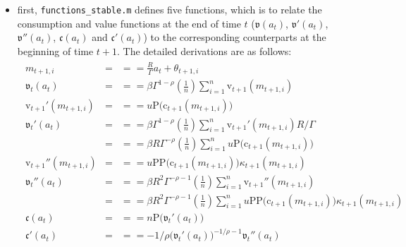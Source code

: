 \documentclass[titlepage,abstract]{\econtex}
\begin{document}
\begin{itemize}
     \item first, \texttt{functions\_stable.m} defines five functions, which is to relate the consumption and value functions at the end of time $t$ ($\ensuremath{\mathfrak{v}}(a_{t})$, $\ensuremath{\mathfrak{v}}'(a_{t})$,
            $\ensuremath{\mathfrak{v}}''(a_{t})$, $\ensuremath{\mathfrak{c}}(a_{t})$ and $\ensuremath{\mathfrak{c}}'(a_{t})$) to the corresponding counterparts at the beginning of time $t+1$. The detailed derivations are as follows:
            \begin{equation}\begin{gathered}\begin{aligned}
            m_{t+1, i}   &=& =  =  \frac{R}{\Gamma} {a}_{t} + \theta_{t+1, i} \\
            \ensuremath{\mathfrak{v}}_{t}(a_{t})   & = &  =  = \beta \Gamma^{1-\rho} \left(\frac{1}{n}\right)\sum_{i=1}^{n} \ensuremath{\mathrm{v}}_{t+1}(m_{t+1, i}) \\
            \ensuremath{\mathrm{v}}_{t+1}'(m_{t+1, i})   &=& =  =  u\text{P}(\ensuremath{\mathrm{c}}_{t+1}(m_{t+1, i})\big) \\
            \ensuremath{\mathfrak{v}}_{t}'(a_{t})   & = &  =  = \beta \Gamma^{1-\rho} \left(\frac{1}{n}\right)\sum_{i=1}^{n} \ensuremath{\mathrm{v}}_{t+1}'(m_{t+1, i}) R/\Gamma\\
              &=& =  =  \beta R \Gamma^{-\rho} \left(\frac{1}{n}\right)\sum_{i=1}^{n}
            u\text{P}(\ensuremath{\mathrm{c}}_{t+1}(m_{t+1, i})\big) \\
            \ensuremath{\mathrm{v}}_{t+1}''(m_{t+1, i})   &=& =  =  u\text{PP}\big(\ensuremath{\mathrm{c}}_{t+1}(m_{t+1, i})\big) \kappa_{t+1}(m_{t+1, i}) \\
            \ensuremath{\mathfrak{v}}_{t}''(a_{t})   & = &  =  = \beta R^{2} \Gamma^{-\rho-1} \left(\frac{1}{n}\right)\sum_{i=1}^{n} \ensuremath{\mathrm{v}}_{t+1}''(m_{t+1, i}) \\
              &=& =  =  \beta R^{2} \Gamma^{-\rho-1} \left(\frac{1}{n}\right)\sum_{i=1}^{n}
              u\text{PP}\big(\ensuremath{\mathrm{c}}_{t+1}(m_{t+1, i})\big) \ensuremath{\kappa}_{t+1}(m_{t+1, i}) \\
              \ensuremath{\mathfrak{c}}(a_{t})   &=& =  =  n\text{P}\big(\ensuremath{\mathfrak{v}}_{t}'(a_{t})\big) \\
              \ensuremath{\mathfrak{c}}'(a_{t})   &=& =  = -1/\rho \big(\ensuremath{\mathfrak{v}}_{t}'(a_{t})\big)^{-1/\rho-1} \ensuremath{\mathfrak{v}}_{t}''(a_{t}) \\

\end{aligned}
\end{gathered}
\end{equation}
\end{itemize}
\end{document}
